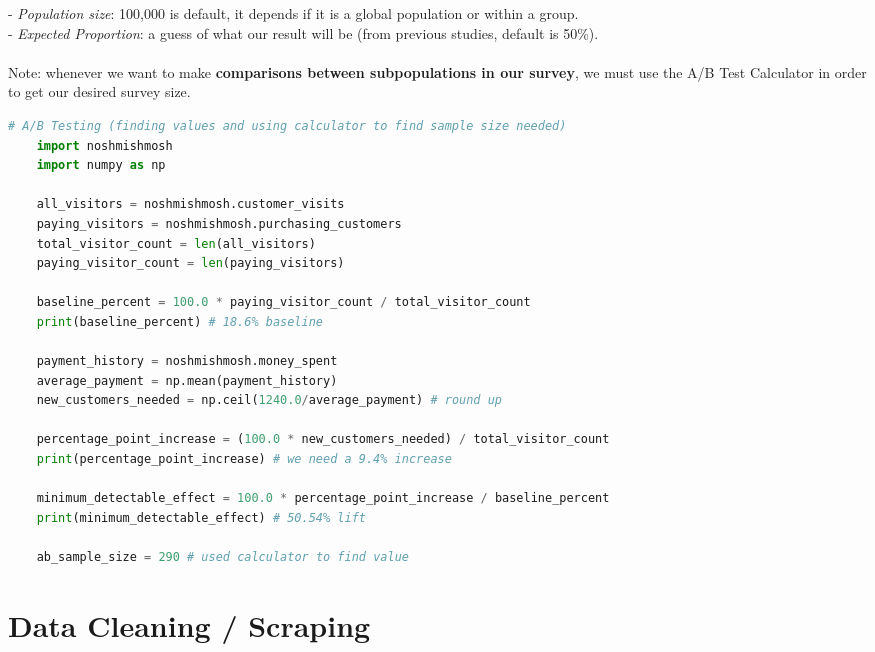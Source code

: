 \documentclass[11pt, a4paper]{article}
\begin{document}
\begin{spacing}{1.1}
	\hspace*{3mm} - \textit{Population size}: 100,000 is default, it depends if it is a global population or within a group.  \\
	\hspace*{3mm} - \textit{Expected Proportion}: a guess of what our result will be (from previous studies, default is 50\%). \\~\\
	Note: whenever we want to make \textbf{comparisons between subpopulations in our survey}, we must use the A/B Test Calculator in order to get our desired survey size. 
	\begin{lstlisting}[language=Python]
	# A/B Testing (finding values and using calculator to find sample size needed)
	import noshmishmosh
	import numpy as np
	
	all_visitors = noshmishmosh.customer_visits
	paying_visitors = noshmishmosh.purchasing_customers 
	total_visitor_count = len(all_visitors)
	paying_visitor_count = len(paying_visitors)
	
	baseline_percent = 100.0 * paying_visitor_count / total_visitor_count
	print(baseline_percent) # 18.6% baseline
	
	payment_history = noshmishmosh.money_spent
	average_payment = np.mean(payment_history)
	new_customers_needed = np.ceil(1240.0/average_payment) # round up
	
	percentage_point_increase = (100.0 * new_customers_needed) / total_visitor_count
	print(percentage_point_increase) # we need a 9.4% increase
	
	minimum_detectable_effect = 100.0 * percentage_point_increase / baseline_percent
	print(minimum_detectable_effect) # 50.54% lift
	
	ab_sample_size = 290 # used calculator to find value \end{lstlisting}\vspace*{4mm}
	
	\section{Data Cleaning / Scraping}

\end{spacing}
\end{document}
